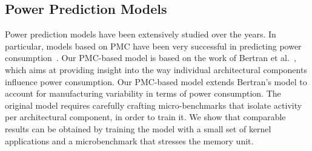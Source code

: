 \subsection{Power Prediction Models} Power prediction models have been extensively studied
over the years.  In particular, models based on PMC have been very successful in
predicting power
consumption~\cite{Bircher:2012:CSP:2196827.2196987,Bertran:2012:SEC:2457472.2457499,Bertran:2010:DRP:1810085.1810108,Goel:2010:PSP:1909624.1909734,Isci:2003:RPM:956417.956567}.
Our PMC-based model is based on the work of Bertran et
al.~\cite{Bertran:2012:SEC:2457472.2457499,Bertran:2010:DRP:1810085.1810108}, which aims
at providing insight into the way individual architectural components influence power
consumption.  Our PMC-based model extends Bertran's model to account for manufacturing
variability in terms of power consumption.  The original model requires carefully crafting
micro-benchmarks that isolate activity per architectural component, in order to train it.
We show that comparable results can be obtained by training the model with a small set of
kernel applications and a microbenchmark that stresses the memory unit.
\par
